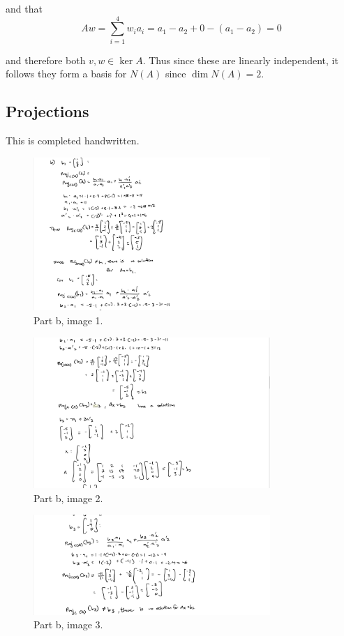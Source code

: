 \documentclass{article}
\theoremstyle{named}
\begin{document}
and that
\[
    Aw = \sum_{i = 1}^4 w_i a_i = a_1 - a_2 + 0 - (a_1 - a_2) = 0
\]

and therefore both $v, w \in \ker A$. Thus since these are linearly independent, it follows they form a basis for $N(A)$ since $\dim N(A) = 2$.

\subsection{Projections}

This is completed handwritten. 

\begin{figure}[ht]
    \centering
    \includegraphics[width=0.8\textwidth]{img1.png}
    \caption{Part b, image 1.}
\end{figure}
\begin{figure}
    \centering
    \includegraphics[width=0.8\textwidth]{img2.png}
    \caption{Part b, image 2.}
\end{figure}
\begin{figure}
    \centering
    \includegraphics[width=0.8\textwidth]{img3.png}
    \caption{Part b, image 3.}
\end{figure}
\end{document}
